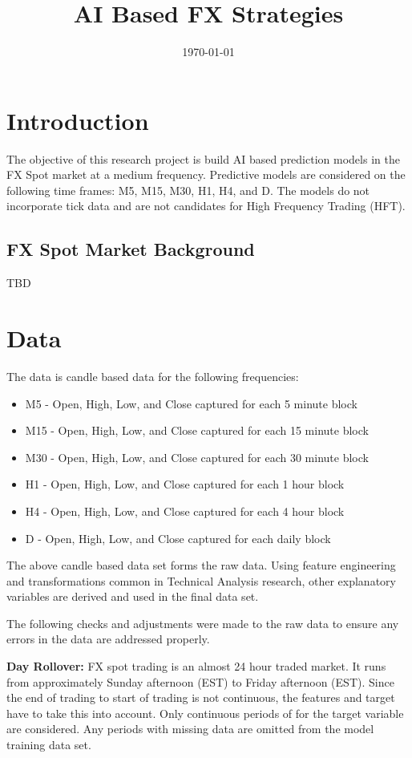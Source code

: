 \documentclass{article}
\title{AI Based FX Strategies}
\author{}
\date{\today}
\begin{document}
	
	\maketitle
		
	\newpage
	\section{Introduction}
	The objective of this research project is build AI based prediction models in the FX Spot market at a medium frequency. Predictive models are considered on the following time frames: M5, M15, M30, H1, H4, and D. The models do not incorporate tick data and are not candidates for High Frequency Trading (HFT).
	
		\subsection{FX Spot Market Background}
		TBD
	
	\newpage
	\section{Data} \label{sec:dataIntro}
	The data is candle based data for the following frequencies:
	\begin{itemize}
		\item M5 - Open, High, Low, and Close captured for each 5 minute block
		\item M15 - Open, High, Low, and Close captured for each 15 minute block
		\item M30 - Open, High, Low, and Close captured for each 30 minute block
		\item H1 - Open, High, Low, and Close captured for each 1 hour block
		\item H4 - Open, High, Low, and Close captured for each 4 hour block
		\item D - Open, High, Low, and Close captured for each daily block
	\end{itemize}
	
	The above candle based data set forms the raw data. Using feature engineering and transformations common in Technical Analysis research, other explanatory variables are derived and used in the final data set.
	
	The following checks and adjustments were made to the raw data to ensure any errors in the data are addressed properly. 
	
	\textbf{Day Rollover: }
	FX spot trading is an almost 24 hour traded market. It runs from approximately Sunday afternoon (EST) to Friday afternoon (EST). Since the end of trading to start of trading is not continuous, the features and target have to take this into account. Only continuous periods of for the target variable are considered. Any periods with missing data are omitted from the model training data set. 
	
\end{document}
